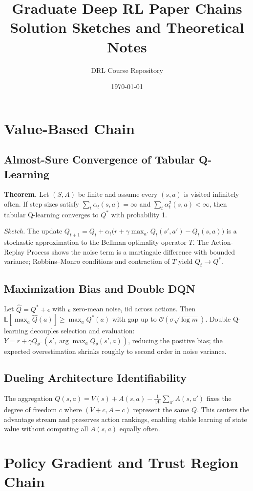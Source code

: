 \documentclass[11pt]{article}
\title{Graduate Deep RL Paper Chains\\Solution Sketches and Theoretical Notes}
\author{DRL Course Repository}
\date{\today}
\newcommand{\E}{\mathbb{E}}
\newcommand{\1}{\mathbf{1}}
\begin{document}
\maketitle
\tableofcontents

\section{Value-Based Chain}
\subsection{Almost-Sure Convergence of Tabular Q-Learning}
\textbf{Theorem.} Let $(S,A)$ be finite and assume every $(s,a)$ is visited infinitely often. If step sizes satisfy $\sum_t \alpha_t(s,a)=\infty$ and $\sum_t \alpha_t^2(s,a)<\infty$, then tabular Q-learning converges to $Q^*$ with probability 1.

\textit{Sketch.} The update $Q_{t+1}=Q_t+\alpha_t\bigl(r+\gamma\max_{a'}Q_t(s',a')-Q_t(s,a)\bigr)$ is a stochastic approximation to the Bellman optimality operator $T$. The Action-Replay Process shows the noise term is a martingale difference with bounded variance; Robbins--Monro conditions and contraction of $T$ yield $Q_t\to Q^*$.

\subsection{Maximization Bias and Double DQN}
Let $\hat{Q}=Q^*+\epsilon$ with $\epsilon$ zero-mean noise, iid across actions. Then $\E[\max_a \hat{Q}(a)]\ge \max_a Q^*(a)$ with gap up to $\mathcal{O}(\sigma \sqrt{\log m})$. Double Q-learning decouples selection and evaluation: $Y=r+\gamma Q_{\theta^-}(s',\arg\max_a Q_{\theta}(s',a))$, reducing the positive bias; the expected overestimation shrinks roughly to second order in noise variance.

\subsection{Dueling Architecture Identifiability}
The aggregation $Q(s,a)=V(s)+A(s,a)-\frac{1}{|A|}\sum_{a'}A(s,a')$ fixes the degree of freedom $c$ where $(V+c, A-c)$ represent the same $Q$. This centers the advantage stream and preserves action rankings, enabling stable learning of state value without computing all $A(s,a)$ equally often.

\section{Policy Gradient and Trust Region Chain}
\end{document}
